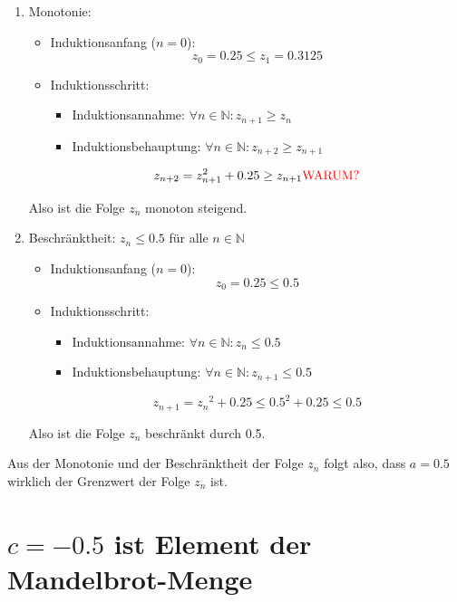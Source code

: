 \documentclass[a4paper, 12pt]{book}
\begin{document}
\begin{enumerate}
\item
  Monotonie:

\begin{itemize}
\item Induktionsanfang (\(n = 0\)):
\[z_{0} = 0.25 \leq z_{1} = 0.3125\]
\item Induktionsschritt:
\begin{itemize}
\item Induktionsannahme: \(\forall n \in \mathbb{N}:z_{n + 1} \geq z_{n}\)
\item Induktionsbehauptung:
\(\forall n \in \mathbb{N}:z_{n + 2} \geq z_{n + 1}\)
\end{itemize}
\[z_{n + 2} = z_{n + 1}^{2} + 0.25 \geq z_{n + 1}\text{\textcolor{red}{WARUM?}}\]
\end{itemize}
Also ist die Folge \(z_{n}\) monoton steigend.

\item
  Beschränktheit: \(z_{n} \leq 0.5\) für alle \(n\mathbb{ \in N}\)
\begin{itemize}
\item Induktionsanfang (\(n = 0\)):
\[z_{0} = 0.25 \leq 0.5\]
\item Induktionsschritt:
\begin{itemize}
\item Induktionsannahme: \(\forall n \in \mathbb{N:}z_{n} \leq 0.5\)
\item Induktionsbehauptung:
\(\forall n \in \mathbb{N:}z_{n + 1} \leq 0.5\)
\end{itemize}
\[z_{n + 1} = {z_{n}}^{2} + 0.25 \leq {0.5}^{2} + 0.25 \leq 0.5\]
\end{itemize}
Also ist die Folge \(z_{n}\) beschränkt durch 0.5.
\end{enumerate}

Aus der Monotonie und der Beschränktheit der Folge \(z_{n}\) folgt also,
dass \(a = 0.5\) wirklich der Grenzwert der Folge \(z_{n}\) ist.
\hfill\blacksquare


\section{$c=-0.5$ ist Element der Mandelbrot-Menge}
\end{document}
